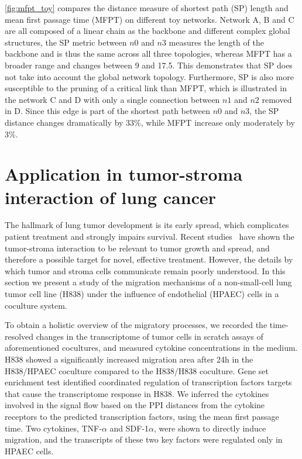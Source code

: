 \ref{fig:mfpt_toy} compares the distance measure of shortest path (SP) length
and mean first passage time (MFPT) on different toy networks. Network A, B and
C are all composed of a linear chain as the backbone and different complex 
global structures, the SP metric between $n0$ and $n3$ 
measures the length of the backbone and is 
thus the same across all three topologies, whereas MFPT has a broader range
and changes between 9 and 17.5. This demonstrates that SP does not take into
account the global network topology. Furthermore, SP is also more susceptible
to the pruning of a critical link than MFPT, which is illustrated in the 
network C and D with only a single connection between $n1$ and $n2$ removed
in D. Since this edge is part of the shortest path between $n0$ and $n3$, the
SP distance changes dramatically by 33\%, while MFPT increase only moderately
by 3\%.

\section{Application in tumor-stroma interaction of lung cancer}

The hallmark of lung tumor development is its early spread, 
which complicates patient treatment and strongly impairs survival.
Recent studies~\citep{Mueller2004} have shown the tumor-stroma interaction to be relevant to 
tumor growth and spread, and therefore a possible target for
novel, effective treatment. 
However, 
the details by which tumor and stroma cells communicate remain poorly 
understood. In this section we present a study
of the migration mechanisms of a non-small-cell lung 
tumor cell line (H838) under the influence of endothelial (HPAEC) cells 
in a coculture system.

To obtain a holistic overview of the migratory processes, 
we recorded the time-resolved changes in the transcriptome of tumor cells
in scratch assays of aforementioned cocultures, and measured
cytokine concentrations in the medium.
H838 showed a significantly increased migration area after 24h in the 
H838/HPAEC coculture compared to the H838/H838 coculture.
Gene set enrichment test identified coordinated regulation
of transcription factors targets
that cause the transcriptome response in H838. 
We inferred the cytokines involved in the signal flow based on the 
PPI distances from the cytokine receptors to the predicted
transcription factors, using the mean first passage time.
Two cytokines, TNF-$\alpha$ and SDF-1$\alpha$, were shown to directly 
induce migration, 
and the transcripts of these two key factors were regulated only 
in HPAEC cells.

